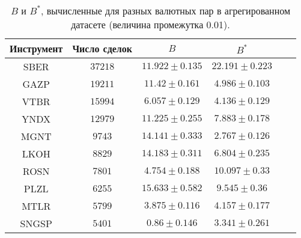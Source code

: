 \begin{table}[h!]
    \begin{center}
        \begin{tabular}{|c|c|c|c|c|c|}
            \hline
            Инструмент & Число сделок & $B$                & $B ^*$            \\ \hline
            SBER & $37218$ & $11.922 \pm 0.135$ & $22.191 \pm 0.223$ \\ \hline
            GAZP       & $19211$      & $11.42 \pm 0.161$  & $4.986 \pm 0.103$ \\ \hline
            VTBR       & $15994$      & $6.057 \pm 0.129$  & $4.136 \pm 0.129$ \\ \hline
            YNDX       & $12979$      & $11.225 \pm 0.255$ & $7.883 \pm 0.178$ \\ \hline
            MGNT       & $9743$       & $14.141 \pm 0.333$ & $2.767 \pm 0.126$ \\ \hline
            LKOH       & $8829$       & $14.183 \pm 0.311$ & $6.804 \pm 0.235$ \\ \hline
            ROSN       & $7801$       & $4.754 \pm 0.188$  & $10.097 \pm 0.33$ \\ \hline
            PLZL       & $6255$       & $15.633 \pm 0.582$ & $9.545 \pm 0.36$  \\ \hline
            MTLR       & $5799$       & $3.875 \pm 0.116$  & $4.157 \pm 0.177$ \\ \hline
            SNGSP      & $5401$       & $0.86 \pm 0.146$   & $3.341 \pm 0.261$ \\ \hline
        \end{tabular}
    \end{center}\caption{$B$ и $B ^*$, вычисленные для разных валютных пар в агрегированном датасете (величина промежутка 0.01).}
    \label{Aggreg1CU0.01} \end{table}

